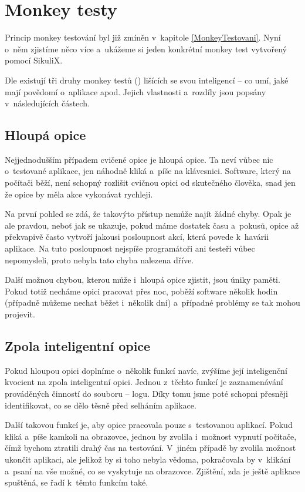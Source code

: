 \chapter{Monkey testy}
Princip monkey testování byl již zmíněn v~kapitole \ref{MonkeyTestovani}. Nyní o~něm zjistíme něco více a~ukážeme si jeden konkrétní monkey test vytvořený pomocí SikuliX.

Dle \citep{Patton} existují tři druhy monkey testů () lišících se svou inteligencí -- co umí, jaké mají povědomí o~aplikace apod. Jejich vlastnosti a~rozdíly jsou popsány v~následujících částech.

	\section{Hloupá opice}
	Nejjednodušším případem cvičené opice je hloupá opice. Ta neví vůbec nic o~testované aplikace, jen náhodně kliká a~píše na klávesnici. Software, který na počítači běží, není schopný rozlišit cvičnou opici od skutečného člověka, snad jen že opice by měla akce vykonávat rychleji.
	
	Na první pohled se zdá, že takovýto přístup nemůže najít žádné chyby. Opak je ale pravdou, neboť jak se ukazuje, pokud máme dostatek času a~pokusů, opice až překvapivě často vytvoří jakousi posloupnost akcí, která povede k~havárii aplikace. Na tuto posloupnost nejspíše programátoři ani testeři vůbec nepomysleli, proto nebyla tato chyba nalezena dříve.
	
	Další možnou chybou, kterou může i~hloupá opice zjistit, jsou úniky paměti. Pokud totiž necháme opici pracovat přes noc, poběží software několik hodin (případně můžeme nechat běžet i~několik dní) a~případné problémy se tak mohou projevit.
	
	\section{Zpola inteligentní opice}
	Pokud hloupou opici doplníme o~několik funkcí navíc, zvýšíme její inteligenční kvocient na zpola inteligentní opici. Jednou z~těchto funkcí je zaznamenávání prováděných činností do souboru -- logu. Díky tomu jsme poté schopni přesněji identifikovat, co se dělo těsně před selháním aplikace.
	
	Další takovou funkcí je, aby opice pracovala pouze s~testovanou aplikací. Pokud kliká a~píše kamkoli na obrazovce, jednou by zvolila i~možnost vypnutí počítače, čímž bychom ztratili drahý čas na testování. V~jiném případě by zvolila možnost ukončit aplikaci, ale jelikož by si toho nebyla vědoma, pokračovala by v~klikání a~psaní na vše možné, co se vyskytuje na obrazovce. Zjištění, zda je ještě aplikace spuštěná, se řadí k~těmto funkcím také.
	
